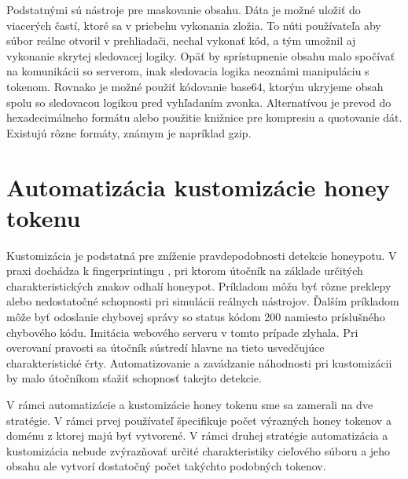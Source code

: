 \documentclass[conference, 11pt,slovak,a4paper,twoside]{IEEEtran}
\begin{document}
Podstatnými sú nástroje pre maskovanie obsahu. Dáta je možné uložiť do viacerých častí, ktoré sa v priebehu vykonania zložia. To núti používateľa aby súbor reálne otvoril v prehliadači, nechal vykonať kód, a tým umožnil aj vykonanie skrytej sledovacej logiky. Opäť by sprístupnenie obsahu malo spočívať na komunikácii so serverom, inak sledovacia logika neoznámi manipuláciu s tokenom. Rovnako je možné použiť kódovanie base64, ktorým ukryjeme obsah spolu so sledovacou logikou pred vyhľadaním zvonka. Alternatívou je prevod do hexadecimálneho formátu alebo použitie knižnice pre kompresiu a quotovanie dát. Existujú rôzne formáty, známym je napríklad gzip. 


\section{Automatizácia kustomizácie honey tokenu} \label{automatizationOfHoneyTokenCustomization}

Kustomizácia je podstatná pre zníženie pravdepodobnosti detekcie honeypotu. V praxi dochádza k fingerprintingu \cite{mohammed_honeypots_2015}, pri ktorom útočník na základe určitých charakteristických znakov odhalí honeypot. Príkladom môžu byť rôzne preklepy alebo nedostatočné schopnosti pri simulácii reálnych nástrojov. Ďalším príkladom môže byť odoslanie chybovej správy so status kódom 200 namiesto príslušného chybového kódu. Imitácia webového serveru v tomto prípade zlyhala. Pri overovaní pravosti sa útočník sústredí hlavne na tieto usvedčujúce charakteristické črty. Automatizovanie a zavádzanie náhodnosti pri kustomizácii by malo útočníkom sťažiť schopnosť takejto detekcie.

V rámci automatizácie a kustomizácie honey tokenu sme sa zamerali na dve stratégie. V rámci prvej používateľ špecifikuje počet výrazných honey tokenov a doménu z ktorej majú byť vytvorené. V rámci druhej stratégie automatizácia a kustomizácia nebude zvýrazňovať určité charakteristiky cieľového súboru a jeho obsahu ale vytvorí dostatočný počet takýchto podobných tokenov.
\end{document}
